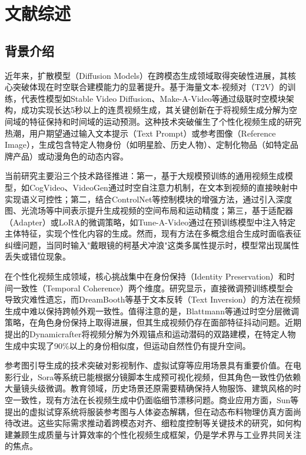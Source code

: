 \cleardoublepage
\newrefsection
\chapter{文献综述}

\section{背景介绍}
\par 近年来，扩散模型（Diffusion Models）在跨模态生成领域取得突破性进展，其核心突破体现在时空联合建模能力的显著提升。基于海量文本-视频对（T2V）的训练，代表性模型如Stable Video Diffusion\cite{blattmann2023stable}、Make-A-Video\cite{singer2022make}等通过级联时空模块架构，成功实现长达5秒以上的连贯视频生成，其关键创新在于将视频生成分解为空间域的特征保持和时间域的运动预测。这种技术突破催生了个性化视频生成的研究热潮，用户期望通过输入文本提示（Text Prompt）或参考图像（Reference Image），生成包含特定人物身份（如明星脸、历史人物）、定制化物品（如特定品牌产品）或动漫角色的动态内容。

当前研究主要沿三个技术路径推进：第一，基于大规模预训练的通用视频生成模型，如CogVideo\cite{hong2022cogvideo}、VideoGen\cite{li2023videogen}通过时空自注意力机制，在文本到视频的直接映射中实现语义可控性；第二，结合ControlNet\cite{zhang2023adding}等控制模块的增强方法，通过引入深度图、光流场等中间表示提升生成视频的空间布局和运动精度；第三，基于适配器（Adapter）或LoRA\cite{hu2022lora}的微调策略，如Tune-A-Video\cite{wu2023tune}通过在预训练模型中注入特定主体特征，实现个性化内容的生成。然而，现有方法在多概念组合生成时面临表征纠缠问题，当同时输入"戴眼镜的柯基犬冲浪"这类多属性提示时，模型常出现属性丢失或错位现象。

在个性化视频生成领域，核心挑战集中在身份保持（Identity Preservation）和时间一致性（Temporal Coherence）两个维度。研究显示，直接微调预训练模型会导致灾难性遗忘，而DreamBooth\cite{ruiz2023dreambooth}等基于文本反转（Text Inversion）的方法在视频生成中难以保持跨帧外观一致性。值得注意的是，Blattmann等\cite{blattmann2023stable}通过时空分层微调策略，在角色身份保持上取得进展，但其生成视频仍存在面部特征抖动问题。近期提出的Dynamicrafter\cite{xing2024dynamicrafter}将视频分解为外观锚点和运动潜码的双路建模，在特定人物生成中实现了90\%以上的身份相似度，但运动自然性仍有提升空间。

参考图引导生成的技术突破对影视制作、虚拟试穿等应用场景具有重要价值。在电影行业，Sora\cite{liu2024sora}等系统已能根据分镜脚本生成预可视化视频，但其角色一致性仍依赖大量镜头级微调。教育领域，历史场景还原需要精确保持人物服饰、建筑风格的时空一致性，现有方法在长视频生成中仍面临细节漂移问题。商业应用方面，Sun等\cite{sun2024outfitanyone}提出的虚拟试穿系统将服装参考图与人体姿态解耦，但在动态布料物理仿真方面尚待改进。这些实际需求推动着跨模态对齐、细粒度控制等关键技术的研究，如何构建兼顾生成质量与计算效率的个性化视频生成框架，仍是学术界与工业界共同关注的焦点。

